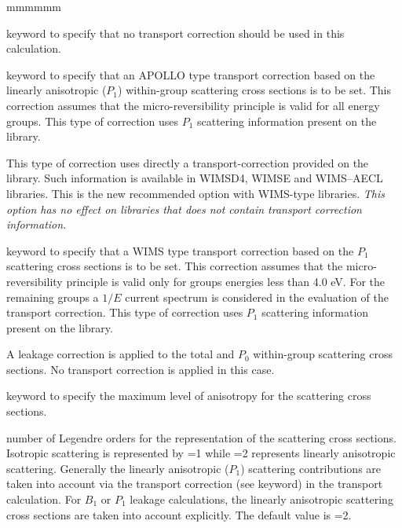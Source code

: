 \begin{ListeDeDescription}{mmmmmm}
\item[\moc{NONE}] keyword to specify that no transport correction should be
used in this calculation.

\item[\moc{APOL}] keyword to specify that an APOLLO type transport correction
based on the linearly anisotropic ($P_1$) within-group scattering cross sections is to be set. This correction assumes that
the micro-reversibility principle is valid for all energy groups. This type of
correction uses $P_1$ scattering information present on the library.

\item[\moc{WIMS}] This type of correction uses directly a transport-correction
provided on the library.
Such information is available in WIMSD4, WIMSE and WIMS--AECL libraries. This is
the new recommended option with WIMS-type libraries. {\sl This option has no effect on
libraries that does not contain transport correction information.}

\item[\moc{OLDW}] keyword to specify that a WIMS type transport
correction based on the $P_1$ scattering cross sections is to be
set. This correction
assumes that the micro-reversibility principle is valid only for groups energies
less than 4.0 eV. For the remaining groups a $1/E$ current spectrum is considered
in the evaluation of the transport correction. This type of correction uses
$P_1$ scattering information present on the library.

\item[\moc{LEAK}] A leakage correction is applied to the total and
$P_0$ within-group scattering cross sections. No transport correction is 
applied in this case.

\item[\moc{ANIS}] keyword to specify the maximum level of anisotropy for the
scattering cross sections.

\item[\dusa{naniso}] number of Legendre orders for the representation of the
scattering cross sections. Isotropic scattering is represented by
=1 while  =2 represents linearly anisotropic
scattering. Generally the linearly anisotropic ($P_1$) scattering contributions are
taken into account via the transport correction (see  keyword) in the
transport calculation. For $B_{1}$ or $P_{1}$ leakage calculations, the linearly
anisotropic scattering cross sections are taken into account explicitly.  The
default value is =2.


\end{ListeDeDescription}
